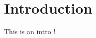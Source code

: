 \chapter{Introduction}

This is an intro \cite{lauer2007trainable}! \cite{Abdi10, adj_matrix, balci1998verification}